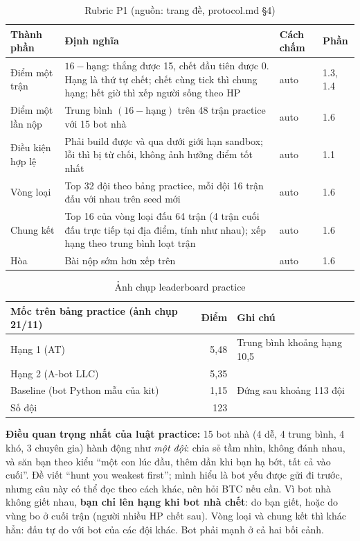 \documentclass[a4paper,12pt]{article}
\newcommand{\src}[1]{{\footnotesize\textcolor{p7}{(nguồn: #1)}}}
\newcommand{\fn}[1]{\texttt{\detokenize{#1}}}
\begin{document}
\begin{table}[H]
\centering\small
\begin{tabularx}{\textwidth}{L{3.3cm}YC{1.6cm}C{1.5cm}}
\toprule
\textbf{Thành phần} & \textbf{Định nghĩa} & \textbf{Cách chấm} & \textbf{Phần} \\
\midrule
Điểm một trận & $16 - \text{hạng}$: thắng được 15, chết đầu tiên được 0. Hạng là thứ tự chết; chết cùng tick thì chung hạng; hết giờ thì xếp người sống theo HP & auto & 1.3, 1.4 \\
Điểm một lần nộp & Trung bình $(16-\text{hạng})$ trên 48 trận practice với 15 bot nhà & auto & 1.6 \\
Điều kiện hợp lệ & Phải build được và qua \fn{check/check.py} dưới giới hạn sandbox; lỗi thì bị từ chối, không ảnh hưởng điểm tốt nhất & auto & 1.1 \\
Vòng loại & Top 32 đội theo bảng practice, mỗi đội 16 trận đấu với nhau trên seed mới & auto & 1.6 \\
Chung kết & Top 16 của vòng loại đấu 64 trận (4 trận cuối đấu trực tiếp tại địa điểm, tính như nhau); xếp hạng theo trung bình loạt trận & auto & 1.6 \\
Hòa & Bài nộp sớm hơn xếp trên & auto & 1.6 \\
\bottomrule
\end{tabularx}
\caption{Rubric P1 \src{trang đề, protocol.md §4}}
\end{table}

\begin{table}[H]
\centering\small
\begin{tabular}{lrl}
\toprule
\textbf{Mốc trên bảng practice (ảnh chụp 21/11)} & \textbf{Điểm} & \textbf{Ghi chú} \\
\midrule
Hạng 1 (AT) & 5,48 & Trung bình khoảng hạng 10,5 \\
Hạng 2 (A-bot LLC) & 5,35 & \\
Baseline (bot Python mẫu của kit) & 1,15 & Đứng sau khoảng 113 đội \\
Số đội & 123 & \\
\bottomrule
\end{tabular}
\caption{Ảnh chụp leaderboard practice}
\end{table}

\begin{mdframed}[linecolor=orange,linewidth=1pt,backgroundcolor=orange!8]
\textbf{Điều quan trọng nhất của luật practice:} 15 bot nhà (4 dễ, 4 trung bình, 4 khó, 3 chuyên gia) hành động như \emph{một đội}: chia sẻ tầm nhìn, không đánh nhau, và săn bạn theo kiểu ``một con lúc đầu, thêm dần khi bạn hạ bớt, tất cả vào cuối''. Đề viết ``hunt you weakest first''; mình hiểu là bot yếu được gửi đi trước, nhưng câu này có thể đọc theo cách khác, nên hỏi BTC nếu cần. Vì bot nhà không giết nhau, \textbf{bạn chỉ lên hạng khi bot nhà chết}: do bạn giết, hoặc do vùng bo ở cuối trận (người nhiều HP chết sau). Vòng loại và chung kết thì khác hẳn: đấu tự do với bot của các đội khác. Bot phải mạnh ở cả hai bối cảnh.
\end{mdframed}
\end{document}
